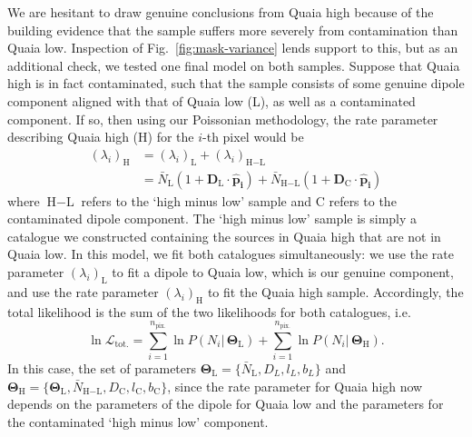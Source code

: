 \documentclass[fleqn,usenatbib]{mnras}
\begin{document}
    We are hesitant to draw genuine conclusions from Quaia high because of the building evidence that the sample suffers more severely from contamination than Quaia low.
    Inspection of Fig.~\ref{fig:mask-variance} lends support to this, but as an additional check, we tested one final model on both samples.
    Suppose that Quaia high is in fact contaminated, such that the sample consists of some genuine dipole component aligned with that of Quaia low (L), as well as a contaminated component.
    If so, then using our Poissonian methodology, the rate parameter describing Quaia high (H) for the $i$-th pixel would be
    \begin{align}
        (\lambda_i)_{\text{H}} &= (\lambda_i)_{\text{L}} + (\lambda_i)_{\text{H} - \text{L}} \label{eq:fitboth1} \\
                               &= \bar{N}_\text{L} (1 + \mathbf{D}_{\text{L}} \cdot \mathbf{\hat{p}_i}) + \bar{N}_{\text{H} - \text{L}} (1 + \mathbf{D}_\text{C} \cdot \mathbf{\hat{p}_i}) \label{eq:fitboth2}
    \end{align}
    where $\text{H} - \text{L}$ refers to the `high minus low' sample and C refers to the contaminated dipole component.
    The `high minus low' sample is simply a catalogue we constructed containing the sources in Quaia high that are not in Quaia low.
    In this model, we fit both catalogues simultaneously: we use the rate parameter $(\lambda_i)_\text{L}$ to fit a dipole to Quaia low, which is our genuine component, and use the rate parameter $(\lambda_i)_{\text{H}}$ to fit the Quaia high sample.
    Accordingly, the total likelihood is the sum of the two likelihoods for both catalogues, i.e.
    \begin{equation}
        \ln \mathcal{L}_{\text{tot.}} = \sum_{i=1}^{n_{\text{pix.}}} \ln P(N_i | \, \mathbf{\Theta}_{\text{L}}) +  \sum_{i=1}^{n_{\text{pix.}}} \ln P(N_i | \, \mathbf{\Theta}_{\text{H}}). \label{eq:fitboth3}
    \end{equation}
    In this case, the set of parameters $\mathbf{\Theta}_{\text{L}} = \{ \bar{N}_{\text{L}}, D_{L}, l_{L}, b_{L} \}$ and $\mathbf{\Theta}_{\text{H}} = \{ \mathbf{\Theta}_{\text{L}}, \bar{N}_{\text{H} - \text{L}}, D_\text{C}, l_{\text{C}}, b_{\text{C}} \}$, since the rate parameter for Quaia high now depends on the parameters of the dipole for Quaia low and the parameters for the contaminated `high minus low' component.
\end{document}
